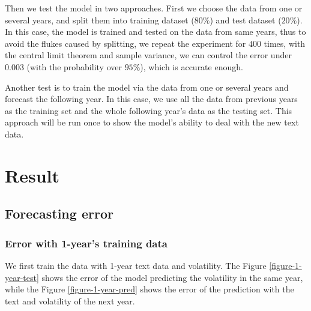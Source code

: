 \documentclass[11pt]{article}
\begin{document}
Then we test the model in two approaches. First we choose the data from one or several years, and split them into training dataset ($80\%$) and test dataset ($20\%$). In this case, the model is trained and tested on the data from same years, thus to avoid the flukes caused by splitting, we repeat the experiment for $400$ times, with the central limit theorem and sample variance, we can control the error under $0.003$ (with the probability over $95\%$), which is accurate enough.

Another test is to train the model via the data from one or several years and forecast the following year. In this case, we use all the data from previous years as the training set and the whole following year's data as the testing set. This approach will be run once to show the model's ability to deal with the new text data.

\section{Result}

\subsection{Forecasting error}

\subsubsection{Error with 1-year's training data}

We first train the data with 1-year text data and volatility. The Figure \ref{figure-1-year-test} shows the error of the model predicting the volatility in the same year, while the Figure \ref{figure-1-year-pred} shows the error of the prediction with the text and volatility of the next year.

\end{document}
